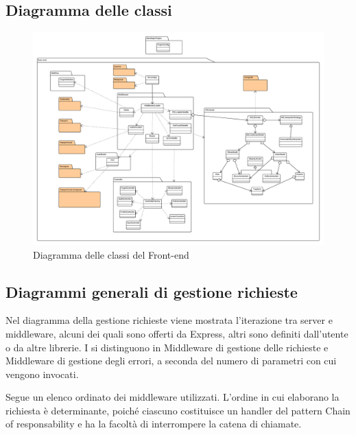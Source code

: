 \subsection{Diagramma delle classi}

\begin{figure}[H]
\centering
\includegraphics[width=\textwidth]{uml/Back-end-Diagramma delle classi.png}
\caption{Diagramma delle classi del Front-end}
\label{diagrammaClassiFrontEnd}
\end{figure}



\subsection{Diagrammi generali di gestione richieste}
Nel diagramma della gestione richieste viene mostrata l'iterazione tra server e middleware, alcuni dei quali sono offerti da Express, altri sono definiti dall'utente o da altre librerie. I  si distinguono in Middleware di gestione delle richieste e Middleware di gestione degli errori, a seconda del numero di parametri con cui vengono invocati.

Segue un elenco ordinato dei middleware utilizzati. L'ordine in cui elaborano la richiesta è determinante, poiché ciascuno costituisce un handler del pattern Chain of responsability e ha la facoltà di interrompere la catena di chiamate.

